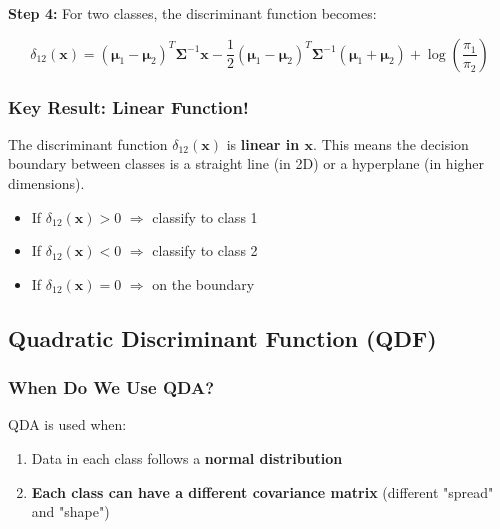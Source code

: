 \documentclass[12pt,a4paper]{article}
\begin{document}
\textbf{Step 4:} For two classes, the discriminant function becomes:

\begin{equation}
\delta_{12}(\mathbf{x}) = (\boldsymbol{\mu}_1-\boldsymbol{\mu}_2)^T\boldsymbol{\Sigma}^{-1}\mathbf{x} - \frac{1}{2}(\boldsymbol{\mu}_1-\boldsymbol{\mu}_2)^T\boldsymbol{\Sigma}^{-1}(\boldsymbol{\mu}_1+\boldsymbol{\mu}_2) + \log\left(\frac{\pi_1}{\pi_2}\right)
\end{equation}

\subsubsection{Key Result: Linear Function!}

The discriminant function $\delta_{12}(\mathbf{x})$ is \textbf{linear in $\mathbf{x}$}. This means the decision boundary between classes is a straight line (in 2D) or a hyperplane (in higher dimensions).

\begin{tcolorbox}[colback=yellow!5!white,colframe=orange!75!black,title=Decision Rule]
\begin{itemize}
    \item If $\delta_{12}(\mathbf{x}) > 0$ $\Rightarrow$ classify to class 1
    \item If $\delta_{12}(\mathbf{x}) < 0$ $\Rightarrow$ classify to class 2
    \item If $\delta_{12}(\mathbf{x}) = 0$ $\Rightarrow$ on the boundary
\end{itemize}
\end{tcolorbox}

\subsection{Quadratic Discriminant Function (QDF)}

\subsubsection{When Do We Use QDA?}

QDA is used when:
\begin{enumerate}
    \item Data in each class follows a \textbf{normal distribution}
    \item \textbf{Each class can have a different covariance matrix} (different "spread" and "shape")
\end{enumerate}
\end{document}

